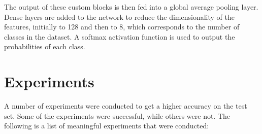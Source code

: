 \documentclass[11pt]{article}
\begin{document}
\begin{multicols}{2}
      The output of these custom blocks is then fed into a global average
      pooling layer. Dense layers are added to the network to reduce the
      dimensionality of the features, initially to 128 and then to 8, which
      corresponds to the number of classes in the dataset. A softmax activation
      function is used to output the probabilities of each class.

      \section{Experiments}


      A number of experiments were conducted to get a higher accuracy on the
      test
      set. Some of the experiments were successful, while others were not. The
      following is a list of meaningful experiments that were conducted:


\end{multicols}
\end{document}
